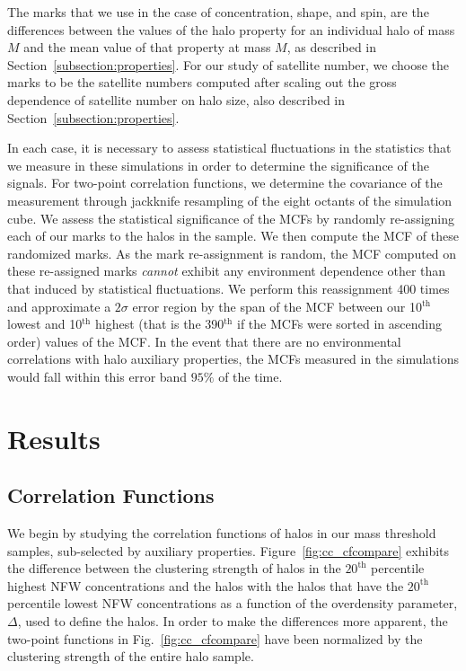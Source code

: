 \documentclass[usenatbib]{mnras}
\begin{document}
The marks that we use in the case of concentration, shape, and spin, are the differences between 
the values of the halo property for an individual halo of mass $M$ and the mean 
value of that property at mass $M$, as described in Section~\ref{subsection:properties}. 
For our study of satellite number, we choose the marks to be the satellite numbers 
computed after scaling out the gross dependence of satellite number on halo size, 
also described in Section~\ref{subsection:properties}. 

In each case, it is necessary to assess statistical fluctuations in the statistics that we measure in these simulations in
order to determine the significance of the signals. For two-point correlation functions, we determine the
covariance of the measurement through jackknife resampling of the eight octants of the simulation cube. We assess
the statistical significance of the MCFs by randomly re-assigning each of our marks to the halos in the sample. 
We then compute the MCF of these randomized marks. As the mark re-assignment is random, 
the MCF computed on these re-assigned marks {\em cannot} exhibit any 
environment dependence other than that induced by statistical fluctuations. 
We perform this reassignment 400 times and approximate a $2\sigma$ error region by 
the span of the MCF between our 10$^\mathrm{th}$ lowest and 10$^\mathrm{th}$ highest (that is the
390$^\mathrm{th}$ if the MCFs were sorted in ascending order) values of the MCF. In the event that there are no
environmental correlations with halo auxiliary properties, the MCFs measured in the simulations would fall within
this error band $95\%$ of the time. 


\section[]{Results}
\label{section:results}


\subsection{Correlation Functions}
\label{sub:cfresults}


We begin by studying the correlation functions of halos in our mass threshold samples, sub-selected by auxiliary
properties. Figure~\ref{fig:cc_cfcompare} exhibits the difference between the clustering strength of halos in the
$20^{\mathrm{th}}$ percentile highest NFW concentrations and the halos with the halos that have the
$20^{\mathrm{th}}$ percentile lowest NFW concentrations as a function of the overdensity parameter, $\Delta$, used to
define the halos. In order to make the differences more apparent, the two-point functions in 
Fig.~\ref{fig:cc_cfcompare} have been normalized by the clustering strength of the entire halo sample. 
\end{document}
